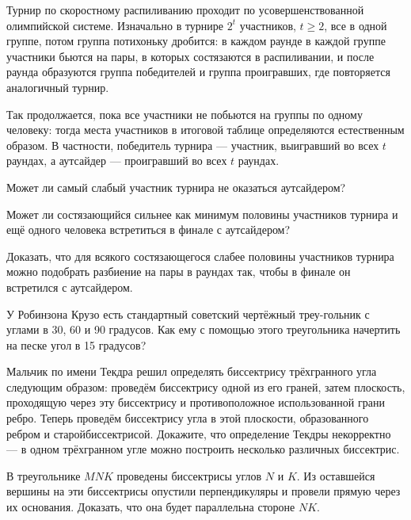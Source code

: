 \noindent Турнир по скоростному распиливанию проходит по усовершенствованной олимпийской системе. Изначально в турнире $2^t$ участников, $t \geq 2$, все в одной группе, потом группа потихоньку дробится: в каждом раунде в каждой группе участники бьются на пары, в которых состязаются в распиливании, и после раунда образуются группа победителей и группа проигравших, где повторяется аналогичный турнир.

\ms Так продолжается, пока все участники не побьются на группы по одному человеку: тогда места участников в итоговой таблице определяются естественным образом. В частности, победитель турнира — участник, выигравший во всех $t$ раундах, а аутсайдер — проигравший во всех $t$ раундах.

\begin{itemize}
\itA Может ли самый слабый участник турнира не оказаться аутсайдером?

\itB Может ли состязающийся сильнее как минимум половины участников турнира и ещё одного человека встретиться в финале с аутсайдером?

\itC Доказать, что для всякого состязающегося слабее половины участников турнира можно подобрать разбиение на пары в раундах так, чтобы в финале он встретился с аутсайдером.
\end{itemize}

\begin{itemize}
\itA У Робинзона Крузо есть стандартный советский чертёжный треу-\linebreak гольник с углами в 30, 60 и 90 градусов. Как ему с помощью этого треугольника начертить на песке угол в 15 градусов?

\itB Мальчик по имени Текдра решил определять биссектрису трёхгранного угла следующим образом: проведём биссектрису одной из его граней, затем плоскость, проходящую через эту биссектрису и противоположное использованной грани ребро. Теперь проведём биссектрису угла в этой плоскости, образованного ребром и старой\linebreak биссектрисой. Докажите, что определение Текдры некорректно — в одном трёхгранном угле можно построить несколько различных биссектрис.

\itC В треугольнике $MNK$ проведены биссектрисы углов $N$ и $K$. Из оставшейся вершины на эти биссектрисы опустили перпендикуляры и провели прямую через их основания. Доказать, что она будет параллельна стороне $NK$.
\end{itemize}
